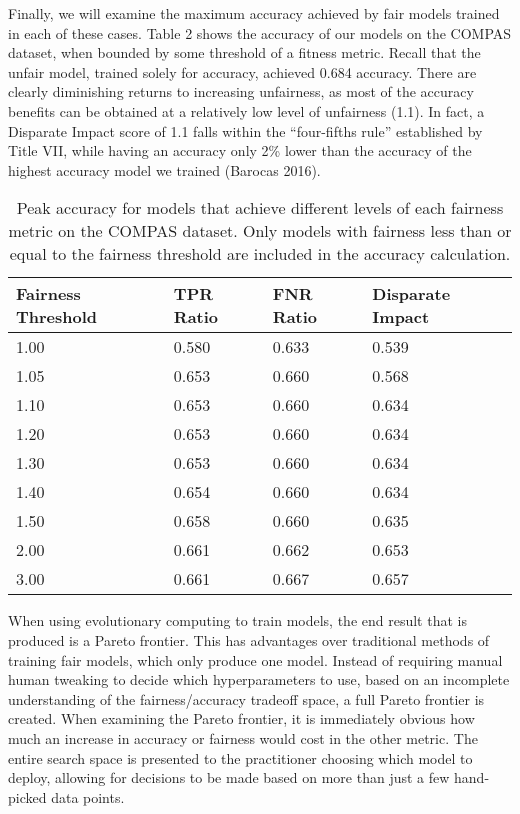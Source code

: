\documentclass[twoside]{article}
\begin{document}

Finally, we will examine the maximum accuracy achieved by fair models trained in each of these cases. Table 2 shows the accuracy of our models on the COMPAS dataset, when bounded by some threshold of a fitness metric. Recall that the unfair model, trained solely for accuracy, achieved 0.684 accuracy. There are clearly diminishing returns to increasing unfairness, as most of the accuracy benefits can be obtained at a relatively low level of unfairness (1.1). In fact, a Disparate Impact score of 1.1 falls within the “four-fifths rule” established by Title VII, while having an accuracy only 2\% lower than the accuracy of the highest accuracy model we trained (Barocas 2016).

\renewcommand{\arraystretch}{1.5}
\begin{table}
	\begin{center}
	\begin{tabular}{| l | l | l | l |}
	\hline
	Fairness Threshold & TPR Ratio & FNR Ratio & Disparate Impact \\ \hline
	1.00    & 0.580 & 0.633 & 0.539 \\ \hline
	1.05 & 0.653 & 0.660 & 0.568 \\ \hline
	1.10  & 0.653 & 0.660 & 0.634 \\ \hline
	1.20  & 0.653 & 0.660 & 0.634 \\ \hline
	1.30  & 0.653 & 0.660 & 0.634 \\ \hline
	1.40  & 0.654 & 0.660 & 0.634 \\ \hline
	1.50  & 0.658 & 0.660 & 0.635 \\ \hline
	2.00   & 0.661 & 0.662 & 0.653 \\ \hline
	3.00    & 0.661 & 0.667 & 0.657 \\ \hline
	\end{tabular}
	\end{center}
\caption{Peak accuracy for models that achieve different levels of each fairness metric on the COMPAS dataset. Only models with fairness less than or equal to the fairness threshold are included in the accuracy calculation.}
\label{table:name}
\end{table}

When using evolutionary computing to train models, the end result that is produced is a Pareto frontier. This has advantages over traditional methods of training fair models, which only produce one model. Instead of requiring manual human tweaking to decide which hyperparameters to use, based on an incomplete understanding of the fairness/accuracy tradeoff space, a full Pareto frontier is created. When examining the Pareto frontier, it is immediately obvious how much an increase in accuracy or fairness would cost in the other metric. The entire search space is presented to the practitioner choosing which model to deploy, allowing for decisions to be made based on more than just a few hand-picked data points.
\end{document}
